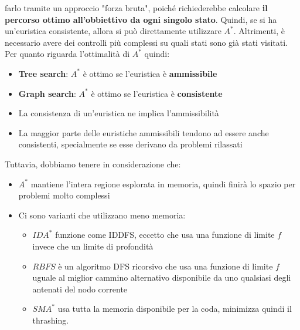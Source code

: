 \documentclass[12pt]{article}
\begin{document}
farlo tramite un approccio "forza bruta", poiché richiederebbe calcolare \textbf{il percorso ottimo all'obbiettivo da ogni singolo stato}.
Quindi, se si ha un'euristica consistente, allora si può direttamente utilizzare $A^*$.
Altrimenti, è necessario avere dei controlli più complessi su quali stati sono già stati visitati.
Per quanto riguarda l'ottimalità di $A^*$ quindi:
\begin{itemize}
    \item \textbf{Tree search}: $A^*$ è ottimo se l'euristica è \textbf{ammissibile}
    \item \textbf{Graph search}: $A^*$ è ottimo se l'euristica è \textbf{consistente}
    \item La consistenza di un'euristica ne implica l'ammissibilità
    \item La maggior parte delle euristiche ammissibili tendono ad essere anche consistenti, specialmente se esse derivano da problemi rilassati
\end{itemize}
Tuttavia, dobbiamo tenere in considerazione che:
\begin{itemize}
    \item $A^*$ mantiene l'intera regione esplorata in memoria, quindi finirà lo spazio per problemi molto complessi
    \item Ci sono varianti che utilizzano meno memoria:
    \begin{itemize}
        \item $IDA^*$ funzione come IDDFS, eccetto che usa una funzione di limite $f$ invece che un limite di profondità
        \item $RBFS$ è un algoritmo DFS ricorsivo che usa una funzione di limite $f$ uguale al miglior cammino alternativo disponibile da uno qualsiasi degli antenati del nodo corrente
        \item $SMA^*$ usa tutta la memoria disponibile per la coda, minimizza quindi il thrashing.
    \end{itemize}
\end{itemize}
\end{document}

